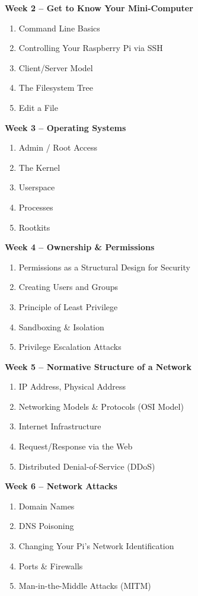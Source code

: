 \documentclass[11pt, a4paper]{article}
\begin{document}
\vspace*{.1in}
\noindent\textbf{Week 2 -- Get to Know Your Mini-Computer}
\begin{enumerate}
\item Command Line Basics
\item Controlling Your Raspberry Pi via SSH
\item Client/Server Model
\item The Filesystem Tree
\item Edit a File
\end{enumerate}

\vspace*{.1in}
\noindent\textbf{Week 3 -- Operating Systems}
\begin{enumerate}
\item Admin / Root Access
\item The Kernel
\item Userspace
\item Processes
\item Rootkits
\end{enumerate}

\vspace*{.1in}
\noindent\textbf{Week 4 -- Ownership \& Permissions}
\begin{enumerate}
\item Permissions as a Structural Design for Security
\item Creating Users and Groups
\item Principle of Least Privilege
\item Sandboxing \& Isolation
\item Privilege Escalation Attacks
\end{enumerate}

\vspace*{.1in}
\noindent\textbf{Week 5 -- Normative Structure of a Network}
\begin{enumerate}
\item IP Address, Physical Address
\item Networking Models \& Protocols (OSI Model)
\item Internet Infrastructure
\item Request/Response via the Web
\item Distributed Denial-of-Service (DDoS)
\end{enumerate}

\vspace*{.1in}
\noindent\textbf{Week 6 -- Network Attacks}
\begin{enumerate}
\item Domain Names
\item DNS Poisoning
\item Changing Your Pi's Network Identification
\item Ports \& Firewalls
\item Man-in-the-Middle Attacks (MITM)
\end{enumerate}
\end{document}
